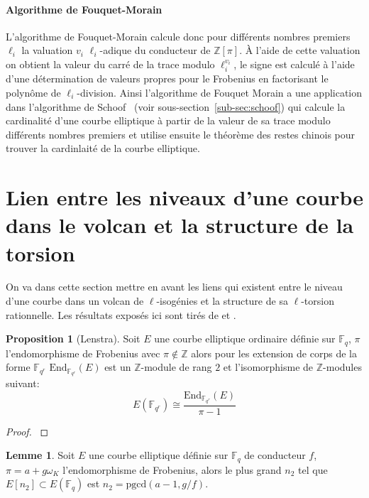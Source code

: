 \documentclass[10pt,a4paper]{book}
\theoremstyle{plain}
\theoremstyle{definition}
\newtheorem{lem}[thm]{Lemme}
\theoremstyle{definition}
\theoremstyle{definition}
\newtheorem{prop}[thm]{Proposition}
\theoremstyle{definition}
\theoremstyle{remark}
\theoremstyle{remark}
\theoremstyle{definition}
\begin{document}
\paragraph{Algorithme de Fouquet-Morain}
L'algorithme de Fouquet-Morain \cite{FouquetMorain02} calcule donc pour 
différents nombres premiers $\ell_i$ la valuation $v_i$ $\ell_i$-adique du 
conducteur de $\mathbb{Z}[\pi]$. \`A l'aide de cette valuation on obtient la 
valeur du carré de la trace modulo $\ell_i^{v_i}$, le signe est calculé à 
l'aide d'une détermination de valeurs propres pour le Frobenius en factorisant 
le polynôme de $\ell_i$-division. Ainsi l'algorithme de Fouquet Morain a une 
application dans l'algorithme de Schoof~\cite{Schoof85} (voir 
sous-section~\ref{sub-sec:schoof}) qui calcule la cardinalité d'une courbe
elliptique à partir de la valeur de sa trace modulo différents nombres premiers
et utilise ensuite le théorème des restes chinois pour trouver la cardinlaité 
de la courbe elliptique. 



\section{Lien entre les niveaux d'une courbe dans le volcan et la structure de la torsion}
\label{sec:lie:niv}
On va dans cette section mettre en avant les liens qui existent entre le niveau
d'une courbe dans un volcan de $\ell$-isogénies et la structure de sa 
$\ell$-torsion rationnelle. Les résultats exposés ici sont tirés de 
\cite{MiretMSTV08} et \cite{Ionica-Joux10}.

\begin{prop}[Lenstra]
\label{pro:len:str}
Soit $E$ une courbe elliptique ordinaire définie sur $\mathbb{F}_q$, $\pi$ 
l'endomorphisme de Frobenius avec $\pi \not \in \mathbb{Z}$ alors pour les 
extension de corps de la forme $\mathbb{F}_{q^r}$ $\mathrm{End}_{
\mathbb{F}_{q^r}}(E)$ est un $\mathbb{Z}$-module de rang $2$ et l'isomorphisme 
de $\mathbb{Z}$-modules suivant:
\[
E(\mathbb{F}_{q^r}) \cong \frac{\mathrm{End}_{\mathbb{F}_{q^r}}(E)}{\pi-1}
\] 
\end{prop}

\begin{proof}
\cite[Theorem 1]{Lenstra1996}
\end{proof}

\begin{lem}
\label{lem:ruc:rat}
Soit $E$ une courbe elliptique définie sur $\mathbb{F}_q$ de conducteur $f$, 
$\pi=a+g \omega_K$ l'endomorphisme de Frobenius, alors le plus grand $n_2$ tel 
que $E[n_2] \subset E(\mathbb{F}_q)$ est $n_2=\mathrm{pgcd}(a-1,g/f)$.
\end{lem}
\end{document}
